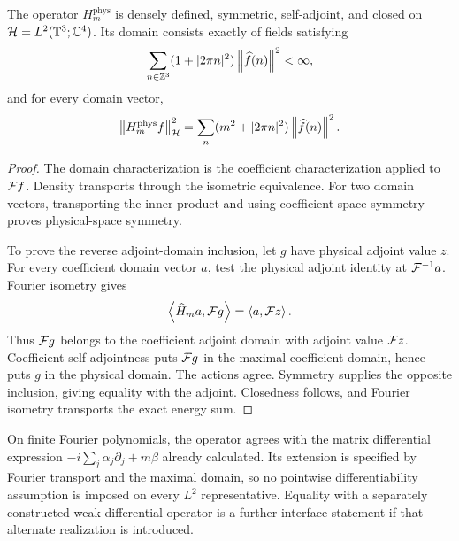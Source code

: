 \begin{theorem}
The operator $H_m^{\mathrm{phys}}$ is densely defined, symmetric, self-adjoint, and closed on $\mathcal H=L^2(\mathbb T^3;\mathbb C^4)$. Its domain consists exactly of fields satisfying
\[
\sum_{n\in\mathbb Z^3}(1+|2\pi n|^2)\left\lVert\widehat f(n)\right\rVert^2<\infty,
\]
and for every domain vector,
\[
\left\lVert H_m^{\mathrm{phys}}f\right\rVert_{\mathcal H}^2
=\sum_n(m^2+|2\pi n|^2)\left\lVert\widehat f(n)\right\rVert^2.
\]
\end{theorem}
\begin{proof}
The domain characterization is the coefficient characterization applied to $\mathcal F f$. Density transports through the isometric equivalence. For two domain vectors, transporting the inner product and using coefficient-space symmetry proves physical-space symmetry.

To prove the reverse adjoint-domain inclusion, let $g$ have physical adjoint value $z$. For every coefficient domain vector $a$, test the physical adjoint identity at $\mathcal F^{-1}a$. Fourier isometry gives
\[
\left\langle\widehat H_ma,\mathcal F g\right\rangle=\left\langle a,\mathcal F z\right\rangle.
\]
Thus $\mathcal F g$ belongs to the coefficient adjoint domain with adjoint value $\mathcal F z$. Coefficient self-adjointness puts $\mathcal F g$ in the maximal coefficient domain, hence puts $g$ in the physical domain. The actions agree. Symmetry supplies the opposite inclusion, giving equality with the adjoint. Closedness follows, and Fourier isometry transports the exact energy sum.
\end{proof}


On finite Fourier polynomials, the operator agrees with the matrix differential expression $-i\sum_j\alpha_j\partial_j+m\beta$ already calculated. Its extension is specified by Fourier transport and the maximal domain, so no pointwise differentiability assumption is imposed on every $L^2$ representative. Equality with a separately constructed weak differential operator is a further interface statement if that alternate realization is introduced.
